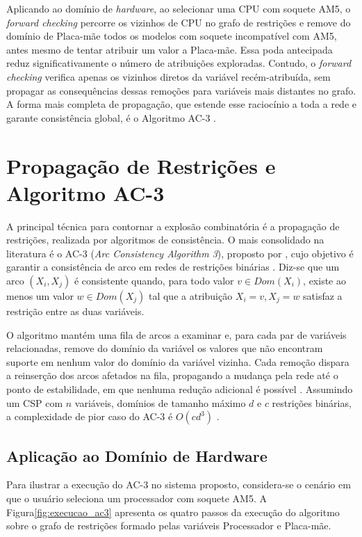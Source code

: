 Aplicando ao domínio de \textit{hardware}, ao selecionar uma CPU com soquete AM5,
o \textit{forward checking} percorre os vizinhos de CPU no grafo de restrições e remove do domínio
de Placa-mãe todos os modelos com soquete incompatível com AM5, antes mesmo de tentar atribuir um valor
a Placa-mãe. Essa poda antecipada reduz significativamente o número de atribuições exploradas.
Contudo, o \textit{forward checking} verifica apenas os vizinhos diretos da variável recém-atribuída,
sem propagar as consequências dessas remoções para variáveis mais distantes no grafo. A forma mais completa
de propagação, que estende esse raciocínio a toda a rede e garante consistência global, é o Algoritmo AC-3 \cite{Mackworth1977,Russell2010}.

\section{Propagação de Restrições e Algoritmo AC-3}
\label{sec:ac3}
A principal técnica para contornar a explosão combinatória é a propagação de restrições,
realizada por algoritmos de consistência. O mais consolidado na literatura é o AC-3
(\textit{Arc Consistency Algorithm 3}), proposto por \cite{Mackworth1977}, cujo objetivo é garantir
a consistência de arco em redes de restrições binárias \cite{Kumar1992}. Diz-se que um arco
$(X_i, X_j)$ é consistente quando, para todo valor $v \in Dom(X_i)$, existe ao menos um valor
$w \in Dom(X_j)$ tal que a atribuição ${X_i = v, X_j = w}$ satisfaz a restrição entre as duas variáveis.

O algoritmo mantém uma fila de arcos a examinar e, para cada par de variáveis relacionadas,
remove do domínio da variável os valores que não encontram suporte em nenhum valor do domínio da
variável vizinha. Cada remoção dispara a reinserção dos arcos afetados na fila, propagando
a mudança pela rede até o ponto de estabilidade, em que nenhuma redução adicional é possível \cite{Russell2010}.
Assumindo um CSP com $n$ variáveis, domínios de tamanho máximo $d$ e $c$ restrições binárias, a complexidade
de pior caso do AC-3 é $O(cd^3)$ \cite{Russell2010}.

\subsection{Aplicação ao Domínio de Hardware}
Para ilustrar a execução do AC-3 no sistema proposto, considera-se o cenário
em que o usuário seleciona um processador com soquete AM5. A Figura\ref{fig:execucao_ac3}
apresenta os quatro passos da execução do algoritmo sobre o grafo de restrições
formado pelas variáveis Processador e Placa-mãe.

